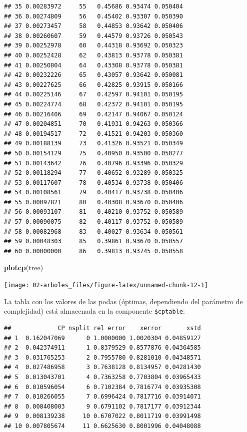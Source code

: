 \documentclass[]{book}
\newenvironment{Shaded}{\begin{snugshade}}{\end{snugshade}}
\newcommand{\KeywordTok}[1]{\textcolor[rgb]{0.13,0.29,0.53}{\textbf{#1}}}
\newcommand{\DecValTok}[1]{\textcolor[rgb]{0.00,0.00,0.81}{#1}}
\newcommand{\OperatorTok}[1]{\textcolor[rgb]{0.81,0.36,0.00}{\textbf{#1}}}
\newcommand{\NormalTok}[1]{#1}
\theoremstyle{break}
\theoremstyle{definition}
\theoremstyle{definition}
\theoremstyle{definition}
\theoremstyle{remark}
\begin{document}
\begin{verbatim}
## 35 0.00283972     55   0.45686 0.93474 0.050404
## 36 0.00274809     56   0.45402 0.93307 0.050390
## 37 0.00273457     58   0.44853 0.93642 0.050406
## 38 0.00260607     59   0.44579 0.93726 0.050543
## 39 0.00252978     60   0.44318 0.93692 0.050323
## 40 0.00252428     62   0.43813 0.93778 0.050381
## 41 0.00250804     64   0.43308 0.93778 0.050381
## 42 0.00232226     65   0.43057 0.93642 0.050081
## 43 0.00227625     66   0.42825 0.93915 0.050166
## 44 0.00225146     67   0.42597 0.94101 0.050195
## 45 0.00224774     68   0.42372 0.94101 0.050195
## 46 0.00216406     69   0.42147 0.94067 0.050124
## 47 0.00204851     70   0.41931 0.94263 0.050366
## 48 0.00194517     72   0.41521 0.94203 0.050360
## 49 0.00188139     73   0.41326 0.93521 0.050349
## 50 0.00154129     75   0.40950 0.93500 0.050277
## 51 0.00143642     76   0.40796 0.93396 0.050329
## 52 0.00118294     77   0.40652 0.93289 0.050325
## 53 0.00117607     78   0.40534 0.93738 0.050406
## 54 0.00108561     79   0.40417 0.93738 0.050406
## 55 0.00097821     80   0.40308 0.93670 0.050406
## 56 0.00093107     81   0.40210 0.93752 0.050589
## 57 0.00090075     82   0.40117 0.93752 0.050589
## 58 0.00082968     83   0.40027 0.93634 0.050561
## 59 0.00048303     85   0.39861 0.93670 0.050557
## 60 0.00000000     86   0.39813 0.93745 0.050558
\end{verbatim}

\begin{Shaded}
\begin{Highlighting}[]
\KeywordTok{plotcp}\NormalTok{(tree)}
\end{Highlighting}
\end{Shaded}

\begin{center}\texttt{[image: 02-arboles\_files/figure-latex/unnamed-chunk-12-1]} \end{center}

La tabla con los valores de las podas (óptimas, dependiendo del
parámetro de complejidad) está almacenada en la componente
\texttt{\$cptable}:

\begin{Shaded}
\end{Shaded}

\begin{verbatim}
##             CP nsplit rel error    xerror       xstd
## 1  0.162047069      0 1.0000000 1.0020304 0.04859127
## 2  0.042374911      1 0.8379529 0.8577876 0.04364585
## 3  0.031765253      2 0.7955780 0.8281010 0.04348571
## 4  0.027486958      3 0.7638128 0.8134957 0.04281430
## 5  0.013043701      4 0.7363258 0.7703804 0.03965433
## 6  0.010596054      6 0.7102384 0.7816774 0.03935308
## 7  0.010266055      7 0.6996424 0.7817716 0.03914071
## 8  0.008408003      9 0.6791102 0.7817177 0.03912344
## 9  0.008139238     10 0.6707022 0.8011719 0.03991498
## 10 0.007805674     11 0.6625630 0.8001996 0.04048088
\end{verbatim}
\end{document}
